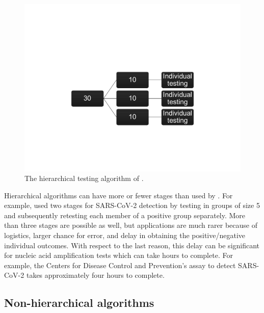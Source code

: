 \begin{figure}
\begin{centering}
\includegraphics[scale=0.37]{figures/images_hier30-10-1BW.pdf}
\par\end{centering}
\caption{\label{fig:hierarchical-Lohse}The hierarchical testing algorithm
of \citet{lohse2020pooling}.}
\end{figure}

Hierarchical algorithms can have more or fewer stages than used by
\citet{lohse2020pooling}. For example, \citet{abdalhamid2020assessment}
used two stages for SARS-CoV-2 detection by testing in groups of size
5 and subsequently retesting each member of a positive group separately.
More than three stages are possible as well, but applications are
much rarer because of logistics, larger chance for error, and delay
in obtaining the positive/negative individual outcomes. With respect
to the last reason, this delay can be significant for nucleic acid
amplification tests which can take hours to complete. For example,
the Centers for Disease Control and Prevention's  assay to detect
SARS-CoV-2 takes approximately four hours to complete.

\subsection{Non-hierarchical algorithms}

